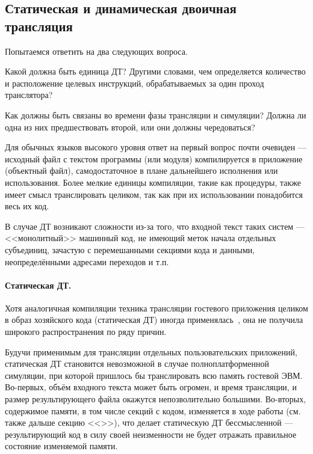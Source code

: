 \subsection[Статическая и динамическая двоичная трансляция]{Статическая и динамическая двоичная трансляция}

Попытаемся ответить на два следующих вопроса.
\begin{enumerate*}
    \item Какой должна быть единица ДТ? Другими словами, чем определяется количество и расположение целевых инструкций, обрабатываемых за один проход транслятора?
    \item Как должны быть связаны во времени фазы трансляции и симуляции? Должна ли одна из них предшествовать второй, или они должны чередоваться?
\end{enumerate*}

Для обычных языков высокого уровня ответ на первый вопрос почти очевиден --- исходный файл с текстом программы (или модуля) компилируется в приложение (объектный файл), самодостаточное в плане дальнейшего исполнения или использования. Более мелкие единицы компиляции, такие как процедуры, также имеет смысл транслировать целиком, так как при их использовании понадобится весь их код. 

В случае ДТ возникают сложности из-за того, что входной текст таких систем --- <<монолитный>> машинный код, не имеющий меток начала отдельных субъединиц, зачастую с перемешанными секциями кода и данными, неопределёнными адресами переходов и т.п.  

\paragraph{Статическая ДТ.} Хотя аналогичная компиляции техника трансляции гостевого приложения целиком в образ хозяйского кода (статическая ДТ) иногда применялась~\cite{Ray97digitalfx32}, она не получила широкого распространения по ряду причин.

Будучи применимым для трансляции отдельных пользовательских приложений, статическая ДТ становится невозможной в случае полноплатформенной симуляции, при которой пришлось бы транслировать всю память гостевой ЭВМ. Во-первых, объём входного текста может быть огромен, и время трансляции, и размер результирующего файла окажутся непозволительно большими. Во-вторых, содержимое памяти, в том числе секций с кодом, изменяется в ходе работы (см. также дальше секцию <<>>), что делает статическую ДТ бессмысленной --- результирующий код в силу своей неизменности не будет отражать правильное состояние изменяемой памяти. 

